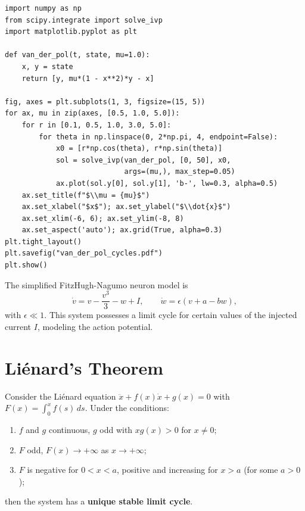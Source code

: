 \begin{codeblock}[title=\textbf{Van der Pol limit cycle}]
\begin{verbatim}
import numpy as np
from scipy.integrate import solve_ivp
import matplotlib.pyplot as plt

def van_der_pol(t, state, mu=1.0):
    x, y = state
    return [y, mu*(1 - x**2)*y - x]

fig, axes = plt.subplots(1, 3, figsize=(15, 5))
for ax, mu in zip(axes, [0.5, 1.0, 5.0]):
    for r in [0.1, 0.5, 1.0, 3.0, 5.0]:
        for theta in np.linspace(0, 2*np.pi, 4, endpoint=False):
            x0 = [r*np.cos(theta), r*np.sin(theta)]
            sol = solve_ivp(van_der_pol, [0, 50], x0,
                            args=(mu,), max_step=0.05)
            ax.plot(sol.y[0], sol.y[1], 'b-', lw=0.3, alpha=0.5)
    ax.set_title(f"$\\mu = {mu}$")
    ax.set_xlabel("$x$"); ax.set_ylabel("$\\dot{x}$")
    ax.set_xlim(-6, 6); ax.set_ylim(-8, 8)
    ax.set_aspect('auto'); ax.grid(True, alpha=0.3)
plt.tight_layout()
plt.savefig("van_der_pol_cycles.pdf")
plt.show()
\end{verbatim}
\end{codeblock}

\begin{example}
The simplified FitzHugh-Nagumo neuron model is
\[
    \dot{v} = v - \frac{v^3}{3} - w + I, \qquad
    \dot{w} = \epsilon(v + a - bw),
\]
with $\epsilon \ll 1$. This system possesses a limit cycle for certain values
of the injected current $I$, modeling the action potential.
\end{example}

\section{Li\'enard's Theorem}

\begin{theorem}[Li\'enard]
Consider the Li\'enard equation $\ddot{x} + f(x)\dot{x} + g(x) = 0$ with
$F(x) = \int_0^x f(s)\, ds$. Under the conditions:
\begin{enumerate}
    \item $f$ and $g$ continuous, $g$ odd with $xg(x) > 0$ for $x \neq 0$;
    \item $F$ odd, $F(x) \to +\infty$ as $x \to +\infty$;
    \item $F$ is negative for $0 < x < a$, positive and increasing for
    $x > a$ (for some $a > 0$);
\end{enumerate}
then the system has a \textbf{unique stable limit cycle}.
\end{theorem}

